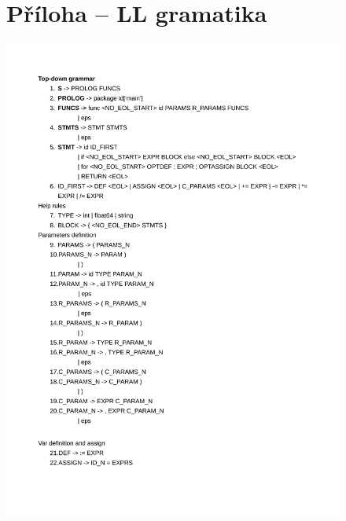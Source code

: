 \documentclass[12pt]{article}
\begin{document}
    \begin{figure}
    \section{Příloha -- LL gramatika}
    \begin{center}
            \includegraphics[scale=0.24]{grammar-1.png}
        \end{center}
    \end{figure}
\end{document}
